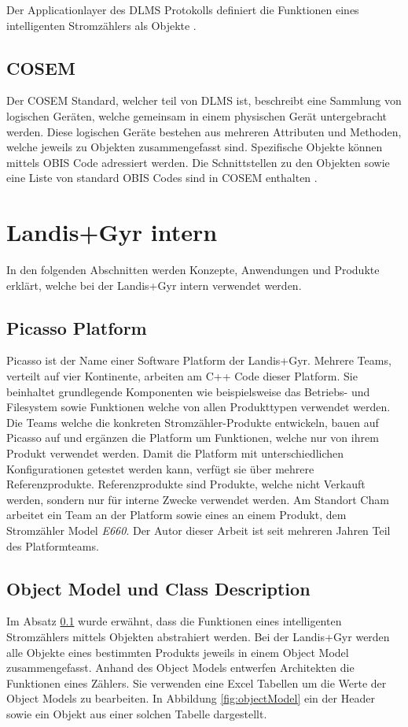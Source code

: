 Der Applicationlayer des \ac{DLMS} Protokolls definiert die Funktionen eines intelligenten Stromzählers als Objekte \parencite{vyas2012advance}.

\subsection{COSEM}\label{cosem}
Der \ac{COSEM} Standard, welcher teil von \ac{DLMS} ist, beschreibt eine Sammlung von logischen Geräten, welche gemeinsam in einem physischen Gerät untergebracht werden.
Diese logischen Geräte bestehen aus mehreren Attributen und Methoden, welche jeweils zu Objekten zusammengefasst sind.
Spezifische Objekte können mittels \ac{OBIS} Code adressiert werden.
Die Schnittstellen zu den Objekten sowie eine Liste von standard \ac{OBIS} Codes sind in \ac{COSEM} enthalten  \parencite{vyas2012advance}.


\section{Landis+Gyr intern}\label{lgintern}
In den folgenden Abschnitten werden Konzepte, Anwendungen und Produkte erklärt, welche bei der Landis+Gyr intern verwendet werden.

\subsection{Picasso Platform}\label{picasso}
Picasso ist der Name einer Software Platform der Landis+Gyr.
Mehrere Teams, verteilt auf vier Kontinente, arbeiten am C++ Code dieser Platform.
Sie beinhaltet grundlegende Komponenten wie beispielsweise das Betriebs- und Filesystem sowie Funktionen welche von allen Produkttypen verwendet werden.
Die Teams welche die konkreten Stromzähler-Produkte entwickeln, bauen auf Picasso auf und ergänzen die Platform um Funktionen, welche nur von ihrem Produkt verwendet werden.
Damit die Platform mit unterschiedlichen Konfigurationen getestet werden kann, verfügt sie über mehrere Referenzprodukte.
Referenzprodukte sind Produkte, welche nicht Verkauft werden, sondern nur für interne Zwecke verwendet werden.
Am Standort Cham arbeitet ein Team an der Platform sowie eines an einem Produkt, dem Stromzähler Model \textit{E660}.
Der Autor dieser Arbeit ist seit mehreren Jahren Teil des Platformteams.



\subsection{Object Model und Class Description}\label{objectModelsClassDescriptions}
Im Absatz \ref{cosem} wurde erwähnt, dass die Funktionen eines intelligenten Stromzählers mittels Objekten abstrahiert werden.
Bei der Landis+Gyr werden alle Objekte eines bestimmten Produkts jeweils in einem Object Model zusammengefasst.
Anhand des Object Models entwerfen Architekten die Funktionen eines Zählers.
Sie verwenden eine Excel Tabellen um die Werte der Object Models zu bearbeiten.
In Abbildung \ref{fig:objectModel} ein der Header sowie ein Objekt aus einer solchen Tabelle dargestellt.

